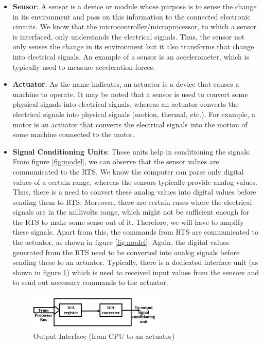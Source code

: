 \documentclass[12pt]{report}
\begin{document}
\begin{itemize}
    \item \textbf{Sensor}: A sensor is a device or module whose purpose is to sense the change in its environment and pass on this information to the connected electronic circuits. We know that the microcontroller/microprocessor, to which a sensor is interfaced, only understands the electrical signals. Thus, the sensor not only senses the change in its environment but it also transforms that change into electrical signals. An example of a sensor is an accelerometer,  which is typically used to measure acceleration forces. 
    \item \textbf{Actuator}: As the name indicates, an actuator is a device that causes a machine to operate. It may be noted that a sensor is used to convert some physical signals into electrical signals, whereas an actuator converts the electrical signals into physical signals (motion, thermal, etc.). For example, a motor is an actuator that converts the electrical signals into the motion of some machine connected to the motor. 
    \item \textbf{Signal Conditioning Units}: These units help in conditioning the signals. From figure \ref{fig:model}, we can observe that the sensor values are communicated to the RTS. We know the computer can parse only digital values of a certain range, whereas the sensors typically provide analog values. Thus, there is a need to convert these analog values into digital values before sending them to RTS. Moreover, there are certain cases where the electrical signals are in the millivolts range, which might not be sufficient enough for the RTS to make some sense out of it. Therefore, we will have to amplify these signals. Apart from this, the commands from RTS are communicated to the actuator, as shown in figure \ref{fig:model}. Again, the digital values generated from the RTS need to be converted into analog signals before sending these to an actuator. Typically, there is a dedicated interface unit (as shown in figure \ref{fig:output}) which is used to received input values from the sensors and to send out necessary commands to the actuator.   
    \begin{figure}[h]
    \centering
    \includegraphics[width=0.6\textwidth]{images/output-interface.png}
    \caption[Output Interface (from CPU to an actuator)]{Output Interface (from CPU to an actuator) \cite{NPTEL}}
    \label{fig:output}
    \end{figure}
\end{itemize}
\end{document}
